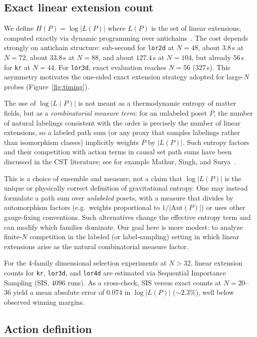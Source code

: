 \documentclass[12pt,a4paper]{article}
\begin{document}
\subsection{Exact linear extension count}
\label{sec:exact}

We define $H(P) = \log |L(P)|$ where $L(P)$ is the set of linear extensions,
computed exactly via dynamic programming over
antichains~\cite{brightwell1991}. The cost depends strongly on antichain
structure: sub-second for \texttt{lor2d} at $N = 48$, about $3.8$\,s at
$N = 72$, about $33.8$\,s at $N = 88$, and about $127.4$\,s at $N = 104$, but
already $56$\,s for \texttt{kr} at $N = 44$. For \texttt{lor3d}, exact
evaluation reaches $N = 56$ ($327$\,s). This asymmetry motivates the
one-sided exact extension strategy adopted for large-$N$ probes
(Figure~\ref{fig:timing}).

The use of $\log|L(P)|$ is not meant as a thermodynamic entropy of matter
fields, but as a \emph{combinatorial measure term}: for an unlabeled poset $P$,
the number of natural labelings consistent with the order is precisely the
number of linear extensions, so a labeled path sum (or any proxy that samples
labelings rather than isomorphism classes) implicitly weights $P$ by
$|L(P)|$. Such entropy factors and their competition with action terms in
causal set path sums have been discussed in the CST literature; see for example
Mathur, Singh, and Surya~\cite{mathur2021}.

This is a choice of ensemble and measure, not a claim that $\log|L(P)|$ is the
unique or physically correct definition of gravitational entropy. One may
instead formulate a path sum over \emph{unlabeled} posets, with a measure that
divides by automorphism factors (e.g.\ weights proportional to $1/|\mathrm{Aut}(P)|$)
or uses other gauge-fixing conventions. Such alternatives change the effective
entropy term and can modify which families dominate. Our goal here is more
modest: to analyze finite-$N$ competition in the labeled (or label-sampling)
setting in which linear extensions arise as the natural combinatorial measure
factor.

For the 4-family dimensional selection experiments at $N > 32$, linear extension
counts for \texttt{kr}, \texttt{lor3d}, and \texttt{lor4d} are estimated via
Sequential Importance Sampling (SIS, 4096 runs). As a cross-check, SIS versus
exact counts at $N = 20$--$36$ yield a mean absolute error of $0.074$ in
$\log|L(P)|$ ($\sim 2.3\%$), well below observed winning margins.

\subsection{Action definition}
\label{sec:action}
\end{document}
